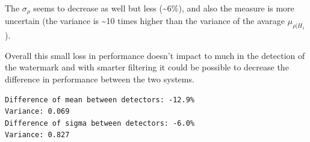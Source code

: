 The \(\sigma_\rho\) seems to decrease as well but less
(\textasciitilde{}6\%), and also the measure is more uncertain (the
variance is \textasciitilde{}10 times higher than the variance of the
avarage \(\mu_{\rho|H_1}\)).

Overall this small loss in performance doesn't impact to much in the
detection of the watermark and with smarter filtering it could be
possible to decrease the difference in performance between the two
systems.

\begin{verbatim}
Difference of mean between detectors: -12.9%
Variance: 0.069
Difference of sigma between detectors: -6.0%
Variance: 0.827
\end{verbatim}
